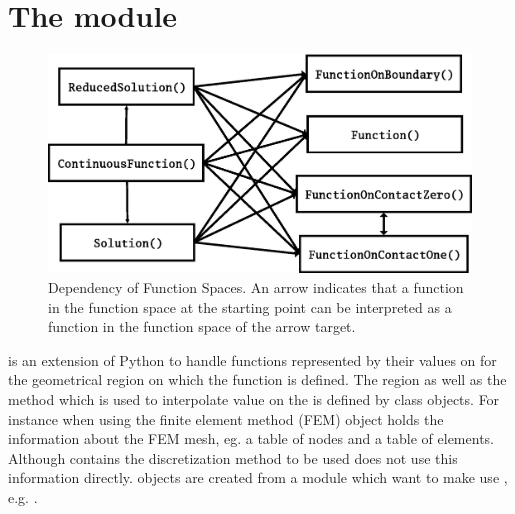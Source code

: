 %
%


\chapter{The module \escript}
\label{ESCRIPT CHAP}


\begin{figure}
\includegraphics[width=\textwidth]{figures/EscriptDiagram1.eps}
\caption{\label{ESCRIPT DEP}Dependency of Function Spaces. An arrow indicates that a function in the 
function space at the starting point can be interpreted as a function in the function space of the arrow target.}
\end{figure}

\escript is an extension of Python to handle functions represented by their values on
\DataSamplePoints for the geometrical region on which
the function is defined. The region as well as the method which is used 
to interpolate value on the \DataSamplePoints is defined by     
\Domain class objects. For instance when using 
the finite element method (FEM)  
\Domain object holds the information about the FEM mesh, eg. 
a table of nodes and a table of elements. Although \Domain contains
the discretization method to be used \escript does not use this information directly.
\Domain objects are created from a module which want to make use 
\escript, e.g. \finley.

